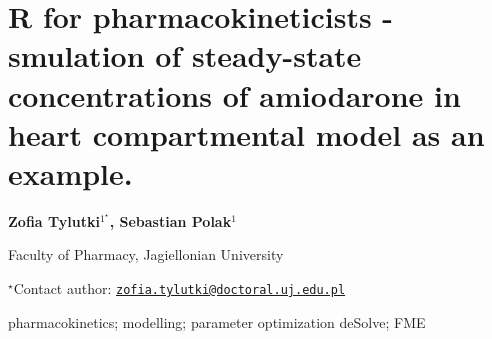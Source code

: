 \documentclass[\main/boa.tex]{subfiles}
\begin{document}
\pagestyle{empty}

\section{R for pharmacokineticists - smulation of steady-state concentrations of
amiodarone in heart compartmental model as an example.}

\begin{center}
  {\bf Zofia Tylutki$^{1^\star}$, Sebastian Polak$^{1}$}
\end{center}

\vskip 0.3cm

\begin{affiliations}
\begin{enumerate}
\begin{minipage}{0.915\textwidth}
\centering
\item Faculty of Pharmacy, Jagiellonian University \\[-2pt]
\end{minipage}
\end{enumerate}
$^\star$Contact author: \href{mailto:zofia.tylutki@doctoral.uj.edu.pl}{\nolinkurl{zofia.tylutki@doctoral.uj.edu.pl}}\\
\end{affiliations}

\vskip 0.5cm

\begin{minipage}{0.915\textwidth}
\keywords pharmacokinetics; modelling; parameter optimization
\packages deSolve; FME
\end{minipage}

\vskip 0.8cm
\end{document}
